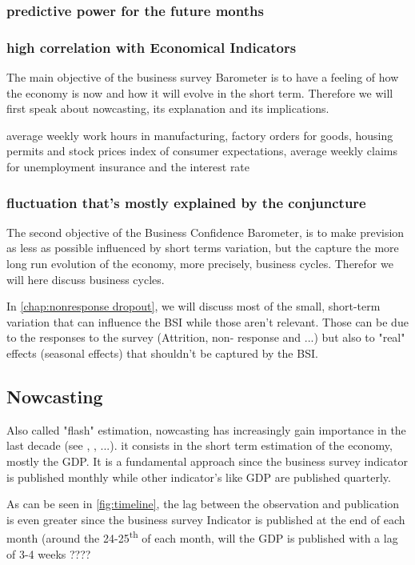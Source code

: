 \documentclass[12pt,a4paper,oneside]{book}
\begin{document}
\subsubsection{predictive power for the future months}
\subsubsection{high correlation with Economical Indicators}

The main objective of the business survey Barometer is to have a feeling of how the economy is now and how it will evolve in the short term. Therefore we will first speak about nowcasting, its explanation and its implications.


average weekly work hours in manufacturing, factory orders for goods, housing permits and stock prices
 index of consumer expectations, average weekly claims for unemployment insurance and the interest rate
 

\subsubsection{fluctuation that's mostly explained by the conjuncture}
The second objective of the Business Confidence Barometer, is to make prevision as less as possible influenced by short terms variation, but the capture the more long run evolution of the economy, more precisely, business cycles. Therefor we will here discuss business cycles.

In \autoref{chap:nonresponse dropout}, we will discuss most of the small, short-term variation that can influence the BSI while those aren't relevant. Those can be due to the responses to the survey (Attrition, non- response and ...) but also to "real" effects (seasonal effects) that shouldn't be captured by the BSI.


\subsection{Nowcasting}

Also called "flash" estimation, nowcasting has increasingly gain importance in the last decade (see \cite{foroni_comparison_2014}, \cite{de_antonio_liedo_nowcasting_2014}, ...).
it consists in the short term estimation of the economy, mostly the GDP.
It is a fundamental approach since the business survey indicator is published monthly while other indicator's like GDP are published quarterly.

As can be seen in \autoref{fig:timeline}, 
the lag between the observation and publication is even greater since the business survey Indicator is published at the end of each month (around the 24-25\textsuperscript{th} of each month, will the GDP is published with a lag of 3-4 weeks ????
\end{document}
